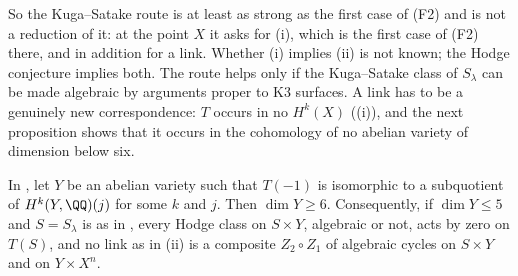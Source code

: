 So the Kuga--Satake route is at least as strong as the first case of (F2) and
is not a reduction of it: at the point $X$ it asks for (i), which is the first
case of (F2) there, and in addition for a link. Whether (i) implies (ii) is
not known; the Hodge conjecture implies both. The route helps only if the
Kuga--Satake class of $S_{\lambda}$ can be made algebraic by arguments proper
to K3 surfaces. A link has to be a genuinely new correspondence: $T$ occurs in
no $H^{k}(X)$ ((i)), and the next proposition shows
that it occurs in the cohomology of no abelian variety of dimension below six.

\begin{proposition}\label{prop:mumfordcarrier}
In , let $Y$ be an abelian variety such that $T(-1)$ is
isomorphic to a subquotient of $H^{k}(Y,\QQ)(j)$ for some $k$ and $j$. Then
$\dim Y\ge6$. Consequently, if $\dim Y\le5$ and $S=S_{\lambda}$ is as in
, every Hodge class on $S\times Y$, algebraic or not, acts
by zero on $T(S)$, and no link as in (ii) is a
composite $Z_{2}\circ Z_{1}$ of algebraic cycles on $S\times Y$ and on
$Y\times X^{n}$.
\end{proposition}

